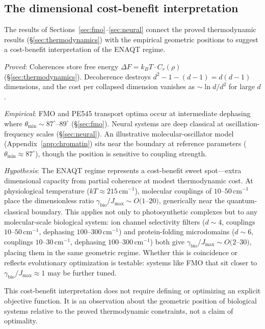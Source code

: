 \documentclass[12pt,a4paper]{article}
\theoremstyle{definition}
\theoremstyle{remark}
\begin{document}
\subsection{The dimensional cost-benefit interpretation}
\label{sec:cost-benefit}

The results of Sections~\ref{sec:fmo}--\ref{sec:neural} connect the proved thermodynamic results (\S\ref{sec:thermodynamics}) with the empirical geometric positions to suggest a cost-benefit interpretation of the ENAQT regime.

\emph{Proved}: Coherences store free energy $\Delta F = k_B T \cdot C_r(\rho)$ (\S\ref{sec:thermodynamics}). Decoherence destroys $d^2 - 1 - (d-1) = d(d-1)$ dimensions, and the cost per collapsed dimension vanishes as $\sim \ln d / d^2$ for large $d$.

\emph{Empirical}: FMO and PE545 transport optima occur at intermediate dephasing where $\theta_{\min} \sim 87^\circ$--$89^\circ$ (\S\ref{sec:fmo}). Neural systems are deep classical at oscillation-frequency scales (\S\ref{sec:neural}). An illustrative molecular-oscillator model (Appendix~\ref{app:chromatin}) sits near the boundary at reference parameters ($\theta_{\min} \approx 87^\circ$), though the position is sensitive to coupling strength.

\emph{Hypothesis}: The ENAQT regime represents a cost-benefit sweet spot---extra dimensional capacity from partial coherence at modest thermodynamic cost. At physiological temperature ($kT \approx 215$\,cm$^{-1}$), molecular couplings of $10$--$50$\,cm$^{-1}$ place the dimensionless ratio $\gamma_{\mathrm{bio}}/J_{\max} \sim O(1$--$20)$, generically near the quantum-classical boundary. This applies not only to photosynthetic complexes but to any molecular-scale biological system: ion channel selectivity filters ($d \sim 4$, couplings $10$--$50$\,cm$^{-1}$, dephasing $100$--$300$\,cm$^{-1}$) and protein-folding microdomains ($d \sim 6$, couplings $10$--$30$\,cm$^{-1}$, dephasing $100$--$300$\,cm$^{-1}$) both give $\gamma_{\mathrm{bio}}/J_{\max} \sim O(2$--$30)$, placing them in the same geometric regime. Whether this is coincidence or reflects evolutionary optimization is testable: systems like FMO that sit closer to $\gamma_{\mathrm{bio}}/J_{\max} \approx 1$ may be further tuned.

This cost-benefit interpretation does not require defining or optimizing an explicit objective function. It is an observation about the geometric position of biological systems relative to the proved thermodynamic constraints, not a claim of optimality.
\end{document}
